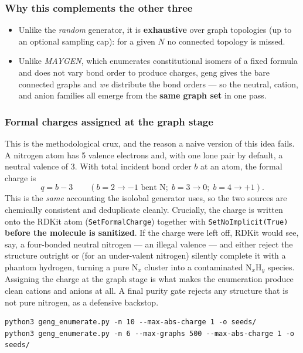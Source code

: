 \documentclass[11pt,a4paper]{article}
\begin{document}
\subsubsection{Why this complements the other three}

\begin{itemize}[itemsep=2pt]
  \item Unlike the \emph{random} generator, it is \textbf{exhaustive} over
    graph topologies (up to an optional sampling cap): for a given $N$ no
    connected topology is missed.
  \item Unlike \emph{MAYGEN}, which enumerates constitutional isomers of a
    fixed formula and does not vary bond order to produce charges, geng gives
    the bare connected graphs and \emph{we} distribute the bond orders --- so
    the neutral, cation, and anion families all emerge from the \textbf{same
    graph set} in one pass.
\end{itemize}

\subsubsection{Formal charges assigned at the graph stage}

This is the methodological crux, and the reason a naive version of this idea
fails. A nitrogen atom has 5 valence electrons and, with one lone pair by
default, a neutral valence of 3. With total incident bond order $b$ at an
atom, the formal charge is
\[
  q = b - 3
  \qquad (b=2 \to -1 \text{ bent N};\; b=3 \to 0;\; b=4 \to +1).
\]
This is the \emph{same} accounting the isolobal generator uses, so the two
sources are chemically consistent and deduplicate cleanly. Crucially, the
charge is written onto the RDKit atom (\texttt{SetFormalCharge}) together with
\texttt{SetNoImplicit(True)} \textbf{before the molecule is sanitized}. If the
charge were left off, RDKit would see, say, a four-bonded neutral nitrogen ---
an illegal valence --- and either reject the structure outright or (for an
under-valent nitrogen) silently complete it with a phantom hydrogen, turning a
pure N$_x$ cluster into a contaminated N$_x$H$_y$ species. Assigning the charge
at the graph stage is what makes the enumeration produce clean cations and
anions at all. A final purity gate rejects any structure that is not pure
nitrogen, as a defensive backstop.

\begin{lstlisting}
python3 geng_enumerate.py -n 10 --max-abs-charge 1 -o seeds/
python3 geng_enumerate.py -n 6 --max-graphs 500 --max-abs-charge 1 -o seeds/
\end{lstlisting}
\end{document}

